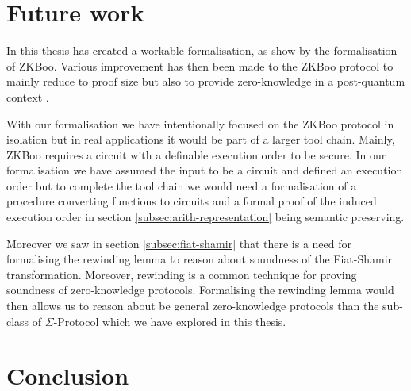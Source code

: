 \section{Future work}
\label{sec:future_work}
In this thesis has created a workable formalisation, as show by the formalisation of
ZKBoo. Various improvement has then been made to the ZKBoo protocol to mainly
reduce to proof size but also to provide zero-knowledge in a post-quantum
context \cite{zkb++}.

With our formalisation we have intentionally focused on the ZKBoo protocol in
isolation but in real applications it would be part of a larger tool chain.
Mainly, ZKBoo requires a circuit with a definable execution order to be secure.
In our formalisation we have assumed the input to be a circuit and defined an
execution order but to complete the tool chain we would need a formalisation of
a procedure converting functions to circuits and a formal proof of the induced
execution order in section \ref{subsec:arith-representation} being semantic preserving.

Moreover we saw in section \ref{subsec:fiat-shamir} that there is a need for
formalising the rewinding lemma to reason about soundness of the Fiat-Shamir
transformation. Moreover, rewinding is a common technique for proving soundness
of zero-knowledge protocols. Formalising the rewinding lemma would then allows
us to reason about be general zero-knowledge protocols than the sub-class of
$\Sigma$-Protocol which we have explored in this thesis.


\section{Conclusion}
\label{sec:conclusion}


